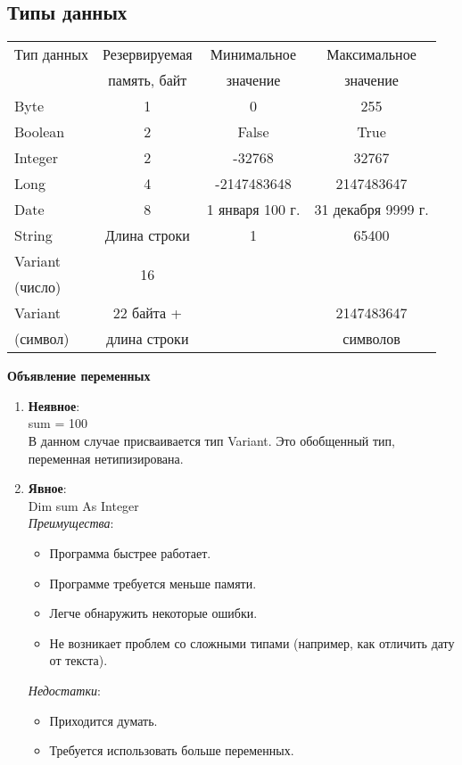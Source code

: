 \subsection{Типы данных}
\begin{minipage}{\textwidth}
\centering
\begin{tabular}{|l|c|c|c|}
\hline
Тип данных & Резервируемая & Минимальное & Максимальное \\
& память, байт & значение & значение \\
\hline
Byte & 1 & 0 & 255 \\
Boolean & 2 & False & True \\
Integer & 2 & -32768 & 32767 \\
Long & 4 & -2147483648 & 2147483647 \\
Date & 8 & 1 января 100 г. & 31 декабря 9999 г. \\
String & Длина строки & 1 & 65400 \\
Variant & \multirow{2}{*}{16} & & \\
(число) & & & \\
Variant & 22 байта + & & 2147483647 \\
(символ) & длина строки & & символов \\
\hline
\end{tabular}
\end{minipage}
\begin{center}
 \textbf{Объявление переменных}
\end{center}
\begin{enumerate}
  \item \textbf{Неявное}:
  \\sum = 100
  \\В данном случае присваивается тип Variant. Это обобщенный тип, переменная нетипизирована.
  \item \textbf{Явное}:
  \\Dim sum As Integer
  \\\emph{Преимущества}:
  \begin{itemize}
    \item Программа быстрее работает.
    \item Программе требуется меньше памяти.
    \item Легче обнаружить некоторые ошибки.
   \item Не возникает проблем со сложными типами (например, как отличить дату от текста).
  \end{itemize}
  \emph{Недостатки}:
  \begin{itemize}
    \item Приходится думать.
    \item Требуется использовать больше переменных.
  \end{itemize}
\end{enumerate}
